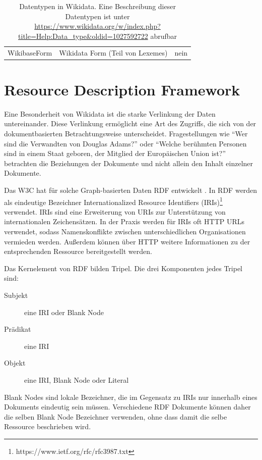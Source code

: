 \begin{table}
\begin{adjustwidth}{-1.5cm}{-0.5cm}
\begin{minipage}{\textwidth}
\begin{tabular}{l p{} p{}}
      WikibaseForm     & Wikidata Form (Teil von Lexemes)                                                                                                                              & nein
    \end{tabular}
    \end{minipage}
  \end{adjustwidth}
  \caption{Datentypen in Wikidata. Eine Beschreibung dieser Datentypen ist unter \url{https://www.wikidata.org/w/index.php?title=Help:Data_type&oldid=1027592722} abrufbar}
  \label{tab:wd-datatypes}
\end{table}

\section{Resource Description Framework}
Eine Besonderheit von Wikidata ist die starke Verlinkung der Daten untereinander.
Diese Verlinkung ermöglicht eine Art des Zugriffs, die sich von der dokumentbasierten Betrachtungsweise unterscheidet.
Fragestellungen wie "`Wer sind die Verwandten von Douglas Adams?"' oder "`Welche berühmten Personen sind in einem Staat geboren, der Mitglied der Europäischen Union ist?"' betrachten die Beziehungen der Dokumente und nicht allein den Inhalt einzelner Dokumente.

Das W3C hat für solche Graph-basierten Daten RDF entwickelt \cite{rdf-spec}.
In RDF werden als eindeutige Bezeichner Internationalized Resource Identifiers (IRIs)\footnote{https://www.ietf.org/rfc/rfc3987.txt} verwendet.
IRIs sind eine Erweiterung von URIs zur Unterstützung von internationalen Zeichensätzen.
In der Praxis werden für IRIs oft HTTP URLs verwendet, sodass Namenskonflikte zwischen unterschiedlichen Organisationen vermieden werden.
Außerdem können über HTTP weitere Informationen zu der entsprechenden Ressource bereitgestellt werden.

Das Kernelement von RDF bilden Tripel. Die drei Komponenten jedes Tripel sind:
\begin{description}
\item[Subjekt] eine IRI oder Blank Node
\item[Prädikat] eine IRI
\item[Objekt] eine IRI, Blank Node oder Literal
\end{description}
Blank Nodes sind lokale Bezeichner, die im Gegensatz zu IRIs nur innerhalb eines Dokuments eindeutig sein müssen.
Verschiedene RDF Dokumente können daher die selben Blank Node Bezeichner verwenden, ohne dass damit die selbe Ressource beschrieben wird.

